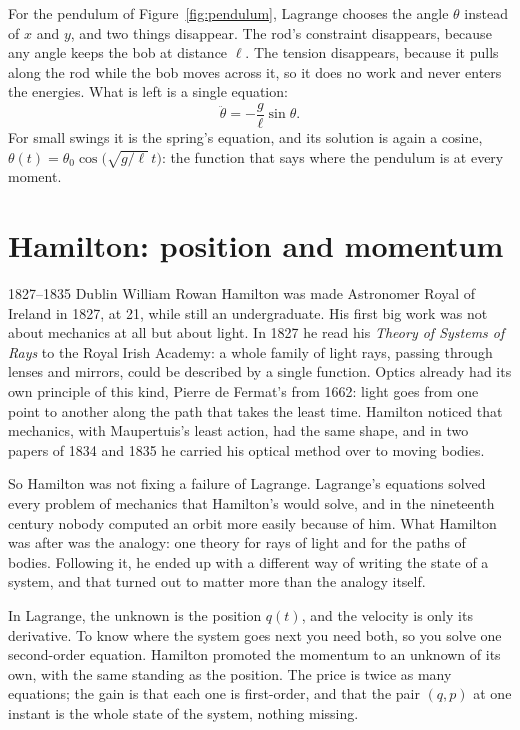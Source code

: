 For the pendulum of Figure~\ref{fig:pendulum}, Lagrange chooses the angle $\theta$
instead of $x$ and $y$, and two things disappear. The rod's constraint disappears,
because any angle keeps the bob at distance $\ell$. The tension disappears, because
it pulls along the rod while the bob moves across it, so it does no work and never
enters the energies. What is left is a single equation:
\[
  \ddot\theta = -\frac{g}{\ell}\sin\theta .
\]
For small swings it is the spring's equation, and its solution is again a cosine,
$\theta(t) = \theta_0\cos\bigl(\sqrt{g/\ell}\,t\bigr)$: the function that says where
the pendulum is at every moment.

\section{Hamilton: position and momentum}

\begin{history}{1827--1835 \textperiodcentered{} Dublin}
William Rowan Hamilton was made Astronomer Royal of Ireland in 1827, at 21, while
still an undergraduate. His first big work was not about mechanics at all but about
light. In 1827 he read his \emph{Theory of Systems of Rays} to the Royal Irish
Academy: a whole family of light rays, passing through lenses and mirrors, could be
described by a single function. Optics already had its own principle of this kind,
Pierre de Fermat's from 1662: light goes from one point to another along the path
that takes the least time. Hamilton noticed that mechanics, with Maupertuis's least
action, had the same shape, and in two papers of 1834 and 1835 he carried his optical
method over to moving bodies.
\end{history}

So Hamilton was not fixing a failure of Lagrange. Lagrange's equations solved every
problem of mechanics that Hamilton's would solve, and in the nineteenth century
nobody computed an orbit more easily because of him. What Hamilton was after was the
analogy: one theory for rays of light and for the paths of bodies. Following it, he
ended up with a different way of writing the state of a system, and that turned out
to matter more than the analogy itself.

In Lagrange, the unknown is the position $q(t)$, and the velocity is only its
derivative. To know where the system goes next you need both, so you solve one
second-order equation. Hamilton promoted the momentum to an unknown of its own,
with the same standing as the position. The price is twice as many equations; the
gain is that each one is first-order, and that the pair $(q, p)$ at one instant is
the whole state of the system, nothing missing.


